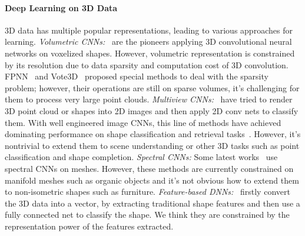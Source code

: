 \paragraph{Deep Learning on 3D Data}

3D data has multiple popular representations, leading to various approaches for learning. 
\emph{Volumetric CNNs:}~\cite{wu20153d, maturana2015voxnet, qi2016volumetric} are the pioneers applying 3D convolutional neural networks on voxelized shapes. However, volumetric representation is constrained by its resolution due to data sparsity and computation cost of 3D convolution. FPNN~\cite{li2016fpnn} and Vote3D~\cite{wang2015voting} proposed special methods to deal with the sparsity problem; however, their operations are still on sparse volumes, it's challenging for them to process very large point clouds. 
\emph{Multiview CNNs:}~\cite{su15mvcnn, qi2016volumetric} have tried to render 3D point cloud or shapes into 2D images and then apply 2D conv nets to classify them. With well engineered image CNNs, this line of methods have achieved dominating performance on shape classification and retrieval tasks~\cite{savvashrec}. However, it's nontrivial to extend them to scene understanding or other 3D tasks such as point classification and shape completion. 
\emph{Spectral CNNs:} Some latest works~\cite{bruna2013spectral, masci2015geodesic} use spectral CNNs on meshes. However, these methods are currently constrained on manifold meshes such as organic objects and it's not obvious how to extend them to non-isometric shapes such as furniture. 
\emph{Feature-based DNNs:}~\cite{fang20153d,guo20153d} firstly convert the 3D data into a vector, by extracting traditional shape features and then use a fully connected net to classify the shape. We think they are constrained by the representation power of the features extracted.




